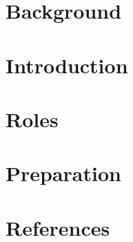 \section[Back]{Background}


\section[Intro]{Introduction}


\section[Roles]{Roles}




% 


\section[Prep]{Preparation}



\section[Refs]{References}
